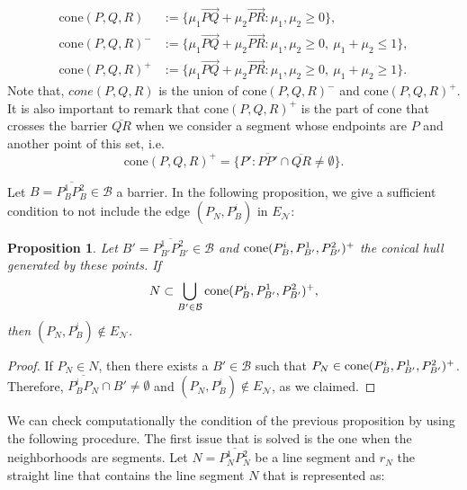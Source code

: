 \documentclass[a4paper]{elsarticle}
\newcommand{\EN}{{E^{}_{\mathcal N}}}
\newtheorem{prop}{Proposition}
\begin{document}
\begin{align*}
\text{cone}(P,Q,R)&:=\{\mu_1 \overrightarrow{PQ}+\mu_2\overrightarrow{PR}:\mu_1,\mu_2\geq 0\},\\
\text{cone}(P,Q,R)^-&:=\{\mu_1 \overrightarrow{PQ}+\mu_2\overrightarrow{PR}:\mu_1,\mu_2\geq 0,\:\mu_1+\mu_2\leq 1\},\\
\text{cone}(P,Q,R)^+&:=\{\mu_1 \overrightarrow{PQ}+\mu_2\overrightarrow{PR}:\mu_1,\mu_2\geq 0,\:\mu_1+\mu_2\geq 1\}.
\end{align*}
Note that, $cone(P, Q, R)$ is the union of $\text{cone}(P,Q,R)^-$ and $\text{cone}(P,Q,R)^+$. It is also important to remark that $\text{cone}(P,Q,R)^+$ is the part of cone that crosses the barrier $\overline{QR}$ when we consider a segment whose endpoints are $P$ and another point of this set, i.e.
$$\text{cone}(P,Q,R)^+=\{P':\overline{PP'}\cap\overline{QR}\neq\emptyset\}.$$

Let $B = \overline{P^1_BP^2_B}\in\mathcal B$ a barrier. In the following proposition, we give a sufficient condition to not include the edge $(P^{}_N, P^i_B)$ in $\EN$:

\begin{prop}

Let $B'=\overline{P^1_{B'}P^2_{B'}}\in\mathcal B$ and $\normalfont{\text{cone}}(P^i_B, P^1_{B'}, P^2_{B'})^+$ the conical hull generated by these points. If
$$N\subset\bigcup_{B'\in\mathcal B}\normalfont{\text{cone}}(P^i_B, P^1_{B'}, P^2_{B'})^+,$$
then $(P^{}_N, P^i_B)\not\in \EN$.

\end{prop}
\begin{proof}
If $P_N\in N$, then there exists a $B'\in\mathcal B$ such that 
$P_N\in \normalfont{\text{cone}}(P^i_B, P^1_{B'}, P^2_{B'})^+$. Therefore, $\overline{P^i_B P^{}_N}\cap B'\neq\emptyset$ and $(P^{}_N, P^i_B)\not\in \EN$, as we claimed.
\end{proof}

We can check computationally the condition of the previous proposition by using the following procedure. The first issue that is solved is the one when the neighborhoods are segments. Let $N = \overline{P^1_N P^2_N}$ be a line segment and $r_N$ the straight line that contains the line segment $N$ that is represented as:
\end{document}
